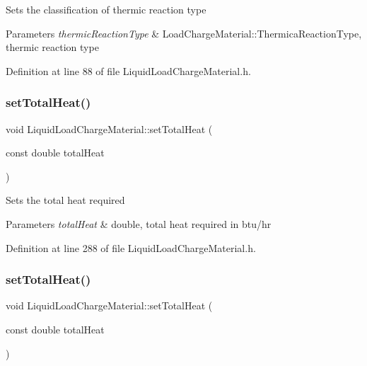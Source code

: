 Sets the classification of thermic reaction type 
\begin{DoxyParams}{Parameters}
{\em thermic\+Reaction\+Type} & Load\+Charge\+Material\+::\+Thermica\+Reaction\+Type, thermic reaction type \\
\hline
\end{DoxyParams}


Definition at line 88 of file Liquid\+Load\+Charge\+Material.\+h.

\mbox{\label{class_liquid_load_charge_material_ad45afc317b72c89cc46016e0b05b50b3}} 
\subsubsection{\texorpdfstring{set\+Total\+Heat()}{setTotalHeat()}\hspace{0.1cm}{\footnotesize\ttfamily [1/3]}}
{\footnotesize\ttfamily void Liquid\+Load\+Charge\+Material\+::set\+Total\+Heat (\begin{DoxyParamCaption}\item[{const double}]{total\+Heat }\end{DoxyParamCaption})\hspace{0.3cm}{\ttfamily [inline]}}

Sets the total heat required 
\begin{DoxyParams}{Parameters}
{\em total\+Heat} & double, total heat required in btu/hr \\
\hline
\end{DoxyParams}


Definition at line 288 of file Liquid\+Load\+Charge\+Material.\+h.

\mbox{\label{class_liquid_load_charge_material_ad45afc317b72c89cc46016e0b05b50b3}} 
\subsubsection{\texorpdfstring{set\+Total\+Heat()}{setTotalHeat()}\hspace{0.1cm}{\footnotesize\ttfamily [2/3]}}
{\footnotesize\ttfamily void Liquid\+Load\+Charge\+Material\+::set\+Total\+Heat (\begin{DoxyParamCaption}\item[{const double}]{total\+Heat }\end{DoxyParamCaption})\hspace{0.3cm}{\ttfamily [inline]}}

